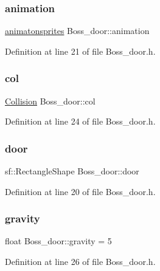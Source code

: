 \subsubsection{\texorpdfstring{animation}{animation}}
{\footnotesize\ttfamily \hyperlink{classanimatonsprites}{animatonsprites} Boss\+\_\+door\+::animation}



Definition at line 21 of file Boss\+\_\+door.\+h.

\hypertarget{class_boss__door_a591dd5dd3815c47b2f8390fe63953ac2}{}\label{class_boss__door_a591dd5dd3815c47b2f8390fe63953ac2} 
\subsubsection{\texorpdfstring{col}{col}}
{\footnotesize\ttfamily \hyperlink{class_collision}{Collision} Boss\+\_\+door\+::col}



Definition at line 24 of file Boss\+\_\+door.\+h.

\hypertarget{class_boss__door_a8b719291e134d7cf4bee8fd2372d3087}{}\label{class_boss__door_a8b719291e134d7cf4bee8fd2372d3087} 
\subsubsection{\texorpdfstring{door}{door}}
{\footnotesize\ttfamily sf\+::\+Rectangle\+Shape Boss\+\_\+door\+::door}



Definition at line 20 of file Boss\+\_\+door.\+h.

\hypertarget{class_boss__door_a780a847f966efcd3073642ade6a7c97f}{}\label{class_boss__door_a780a847f966efcd3073642ade6a7c97f} 
\subsubsection{\texorpdfstring{gravity}{gravity}}
{\footnotesize\ttfamily float Boss\+\_\+door\+::gravity = 5}



Definition at line 26 of file Boss\+\_\+door.\+h.

\hypertarget{class_boss__door_aa9c098587ea1c0919540f838e28c1440}{}\label{class_boss__door_aa9c098587ea1c0919540f838e28c1440} 
